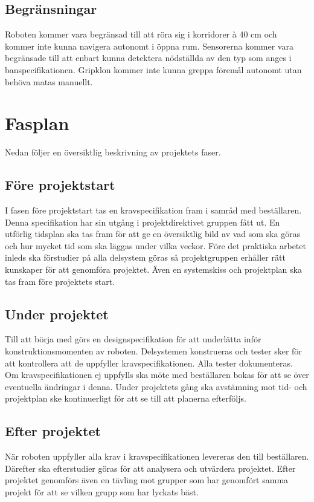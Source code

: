 \documentclass[11pt]{article}
\begin{document}
\begin{flushleft}
\subsection{Begränsningar}
Roboten kommer vara begränsad till att röra sig i korridorer à 40 cm och kommer inte kunna navigera autonomt i öppna rum. Sensorerna kommer vara begränsade till att enbart kunna detektera nödställda av den typ som anges i banspecifikationen. Gripklon kommer inte kunna greppa föremål autonomt utan behöva matas manuellt.

\pagebreak
\section{Fasplan}
Nedan följer en översiktlig beskrivning av projektets faser.
\subsection{Före projektstart}
I fasen före projektstart tas en kravspecifikation fram i samråd med beställaren. Denna specifikation har sin utgång i projektdirektivet gruppen fått ut. En utförlig tidsplan ska tas fram för att ge en översiktlig bild av vad som ska göras och hur mycket tid som ska läggas under vilka veckor. Före det praktiska arbetet inleds ska förstudier på alla delsystem göras så projektgruppen erhåller rätt kunskaper för att genomföra projektet. Även en systemskiss och projektplan ska tas fram före projektets start.

\subsection{Under projektet}
Till att börja med görs en designspecifikation för att underlätta inför konstruktionsmomenten av roboten. Delsystemen konstrueras och tester sker för att kontrollera att de uppfyller kravspecifikationen. Alla tester dokumenteras. Om kravspecifikationen ej uppfylls ska möte med beställaren bokas för att se över eventuella ändringar i denna. Under projektets gång ska avstämning mot tid- och projektplan ske kontinuerligt för att se till att planerna efterföljs.

\subsection{Efter projektet}
När roboten uppfyller alla krav i kravspecifikationen levereras den till beställaren. Därefter ska efterstudier göras för att analysera och utvärdera projektet. Efter projektet genomförs även en tävling mot grupper som har genomfört samma projekt för att se vilken grupp som har lyckats bäst. 


\end{flushleft}
\end{document}
